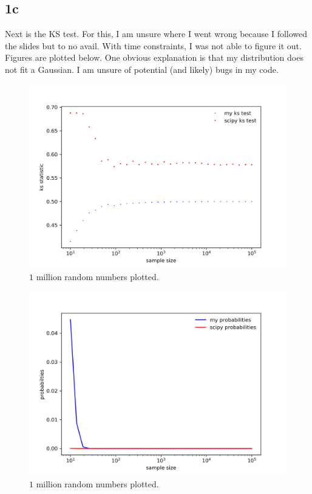 \subsection{1c}


Next is the KS test. For this, I am unsure where I went wrong because
I followed the slides but to no avail. With time constraints, I was not
able to figure it out. Figures are plotted below. One obvious explanation
is that my distribution does not fit a Gaussian. I am unsure of potential
(and likely) bugs in my code.
\begin{figure}[h!]
    \centering
    \includegraphics[width=0.9\linewidth]{./plots/ks_stat.png}
    \caption{$1$ million random numbers plotted.}
    \label{p1c1}
\end{figure}

\begin{figure}[h!]
    \centering
    \includegraphics[width=0.9\linewidth]{./plots/ks_prob.png}
    \caption{$1$ million random numbers plotted.}
    \label{p1c2}
\end{figure}

